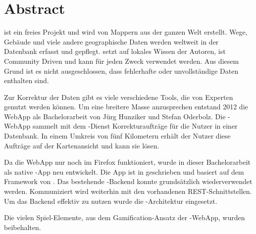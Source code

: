 \chapter*{Abstract}
\thispagestyle{scrheadings}

 ist ein freies Projekt und wird von Mappern aus der ganzen Welt erstellt. 
Wege, Gebäude und viele andere geographische Daten werden weltweit in der Datenbank erfasst und gepflegt. 
  setzt auf lokales Wissen der Autoren, ist Community Driven und kann für jeden Zweck verwendet werden. 
 Aus diesem Grund ist es nicht ausgeschlossen, dass fehlerhafte oder unvollständige Daten enthalten sind.
 
 Zur Korrektur der Daten gibt es viele verschiedene Tools, die von Experten genutzt werden können.
 Um eine breitere Masse anzusprechen entstand 2012 die \gls{WebApp} \kort{} als Bachelorarbeit von Jürg Hunziker und Stefan Oderbolz.
 Die \kort{}-\gls{WebApp} sammelt mit dem -Dienst Korrekturaufträge für die Nutzer in einer  Datenbank.
 In einem Umkreis von fünf Kilometern erhält der Nutzer diese Aufträge auf der Kartenansicht und kann sie lösen.
 
 Da die \gls{WebApp} nur noch im Firefox funktioniert, wurde \kort{} in dieser Bachelorarbeit als native -App neu entwickelt. 
 Die App ist in  geschrieben und basiert auf dem  Framework von .
 Das bestehende \kort{}-Backend konnte grundsätzlich  wiederverwendet werden.
 Kommuniziert wird weiterhin mit den vorhandenen \gls{REST}-Schnittstellen.
 Um das Backend effektiv zu nutzen wurde die -Architektur eingesetzt.
 
 Die vielen Spiel-Elemente, aus dem \gls{Gamification}-Ansatz der \kort{}-\gls{WebApp}, wurden beibehalten.
 